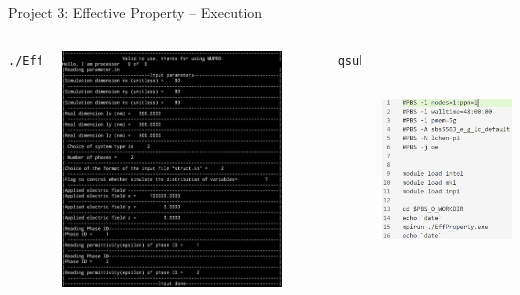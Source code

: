 \documentclass[11pt,aspectratio=169]{beamer}
\begin{document}
\begin{frame}[fragile]{Project 3: Effective Property -- Execution}
\begin{columns}
\centering
\begin{lstlisting}[language=bash]
./EffProperty.exe
\end{lstlisting}
\includegraphics[height=0.85\textwidth]{img/eff_run.png}
\centering
\begin{lstlisting}[language=bash]
qsub eff.pbs
\end{lstlisting}
\includegraphics[height=0.85\textwidth]{img/eff_pbs.png}
\end{columns}
\end{frame}
\end{document}

